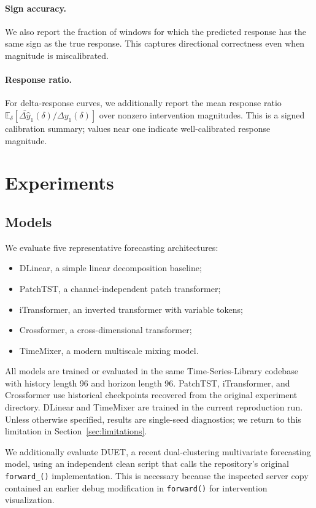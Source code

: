 \documentclass{article}
\begin{document}
\paragraph{Sign accuracy.}
We also report the fraction of windows for which the predicted response has the same
sign as the true response. This captures directional correctness even when magnitude
is miscalibrated.

\paragraph{Response ratio.}
For delta-response curves, we additionally report the mean response ratio
$\mathbb{E}_\delta[\bar{\Delta\hat{y}}_1(\delta)/\Delta y_1(\delta)]$ over
nonzero intervention magnitudes. This is a signed calibration summary; values near
one indicate well-calibrated response magnitude.

\section{Experiments}

\subsection{Models}

We evaluate five representative forecasting architectures:
\begin{itemize}[leftmargin=*]
    \item DLinear, a simple linear decomposition baseline;
    \item PatchTST, a channel-independent patch transformer;
    \item iTransformer, an inverted transformer with variable tokens;
    \item Crossformer, a cross-dimensional transformer;
    \item TimeMixer, a modern multiscale mixing model.
\end{itemize}

All models are trained or evaluated in the same Time-Series-Library codebase with
history length 96 and horizon length 96. PatchTST, iTransformer, and Crossformer use
historical checkpoints recovered from the original experiment directory. DLinear and
TimeMixer are trained in the current reproduction run. Unless otherwise specified,
results are single-seed diagnostics; we return to this limitation in
Section~\ref{sec:limitations}.

We additionally evaluate DUET, a recent dual-clustering multivariate forecasting
model, using an independent clean script that calls the repository's original
\texttt{forward\_()} implementation. This is necessary because the inspected server
copy contained an earlier debug modification in \texttt{forward()} for intervention
visualization.
\end{document}
